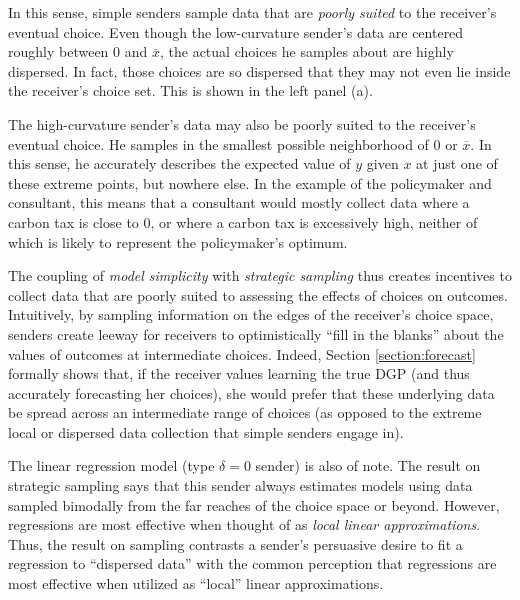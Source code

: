 \documentclass[11pt,dvipsnames]{article}
\begin{document}
In this sense, simple senders sample data that are \emph{poorly suited} to the receiver's eventual choice.
Even though the low-curvature sender's data are centered roughly between $0$ and $\overline{x}$, the actual choices he samples about are highly dispersed. In fact, those choices are so dispersed that they may not even lie inside the receiver's choice set.
This is shown in the left panel (a).

The high-curvature sender's data may also be poorly suited to the receiver's eventual choice.
He samples in the smallest possible neighborhood of $0$ or $\overline{x}$.
In this sense, he accurately describes the expected value of $y$ given $x$ at just one of these extreme points, but nowhere else.
In the example of the policymaker and consultant, this means that a consultant would mostly collect data where a carbon tax is close to $0$, or where a carbon tax is excessively high, neither of which is likely to represent the policymaker's optimum.

The coupling of \emph{model simplicity} with \emph{strategic sampling} thus creates incentives to collect data that are poorly suited to assessing the effects of choices on outcomes.
Intuitively, by sampling information on the edges of the receiver's choice space, senders create leeway for receivers to optimistically ``fill in the blanks'' about the values of outcomes at intermediate choices.
Indeed, Section \ref{section:forecast} formally shows that, if the receiver values learning the true DGP (and thus accurately forecasting her choices), she would prefer that these underlying data be spread across an intermediate range of choices (as opposed to the extreme local or dispersed data collection that simple senders engage in).

The linear regression model (type $\delta = 0$ sender) is also of note.
The result on strategic sampling says that this sender always estimates models using data sampled bimodally from the far reaches of the choice space or beyond.
However, regressions are most effective when thought of as \emph{local linear approximations}.
Thus, the result on sampling contrasts a sender's persuasive desire to fit a regression to ``dispersed data'' with the common perception that regressions are most effective when utilized as ``local'' linear approximations.
\end{document}
